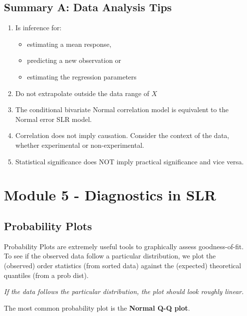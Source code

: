 \documentclass[11pt]{article}
\theoremstyle{definition}
\numberwithin{equation}{section}
\begin{document}
\subsection{Summary A: Data Analysis Tips}
\begin{enumerate}
  \item Is inference for:
  \begin{itemize}
    \item estimating a mean response,
    \item predicting a new observation or
    \item estimating the regression parameters
  \end{itemize}
  \item Do not extrapolate outside the data range of $X$
  \item The conditional bivariate Normal correlation model is equivalent to the Normal error SLR model.
  \item Correlation does not imply causation. Consider the context of the data, whether experimental or non-experimental.
  \item Statistical significance does NOT imply practical significance and vice versa.
\end{enumerate}

\newpage
\section{Module 5 - Diagnostics in SLR}
\subsection{Probability Plots}
Probability Plots are extremely useful tools to graphically assess goodness-of-fit. To see if the observed data follow a particular distribution, we plot the (observed) order statistics (from sorted data) against the (expected) theoretical quantiles (from a prob dist).

\textit{If the data follows the particular distribution, the plot should look roughly linear.}

The most common probability plot is the \textbf{Normal Q-Q plot}.
\end{document}
